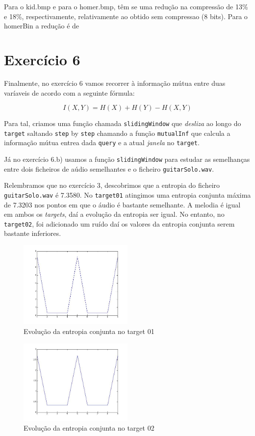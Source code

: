 \documentclass[12pt]{article}
\begin{document}
Para o kid.bmp e para o homer.bmp, têm se uma redução na compressão de 13\% e 18\%, respectivamente, relativamente ao obtido sem compressao (8 bits). Para o homerBin a redução é de 


\section{Exercício 6}

  Finalmente, no exercício 6 vamos recorrer à informação mútua entre duas
  varíaveis de acordo com a seguinte fórmula:

  $$
    I(X,Y) = H(X) + H(Y) - H(X,Y)
  $$

  Para tal, criamos uma função chamada \texttt{slidingWindow} que
  \textit{desliza} ao longo do \texttt{target} saltando \texttt{step}
  by \texttt{step} chamando a função \texttt{mutualInf} que calcula a informação
  mútua entrea dada \texttt{query} e a atual \textit{janela} no \texttt{target}.

  Já no exercício 6.b) usamos a função \texttt{slidingWindow} para
  estudar as semelhanças entre dois ficheiros de aúdio semelhantes e
  o ficheiro \texttt{guitarSolo.wav}.

  Relembramos que no exercício 3, descobrimos que a entropia do ficheiro
  \texttt{guitarSolo.wav} é 7.3580. No \texttt{target01}
  atingimos uma entropia conjunta máxima de 7.3203 nos pontos em que
  o áudio é bastante semelhante. A melodia é igual em ambos os \textit{targets},
  daí a evolução da entropia ser igual. No entanto, no \texttt{target02},
  foi adicionado um ruído daí os valores da entropia conjunta serem
  bastante inferiores.

  \begin{figure}[H]
    \centering
    \includegraphics[width=0.5\textwidth]{ex6a}
    \caption{Evolução da entropia conjunta no target 01}
  \end{figure}

  \begin{figure}[H]
    \centering
    \includegraphics[width=0.5\textwidth]{ex6b}
    \caption{Evolução da entropia conjunta no target 02}
  \end{figure}
\end{document}
